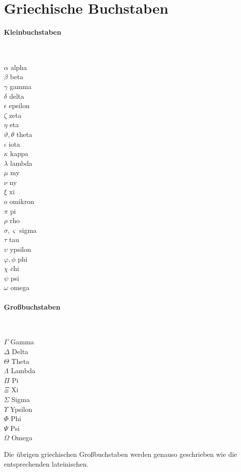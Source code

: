 \documentclass[fontsize=11pt, twoside=false, numbers=autoenddot]{scrbook}
\begin{document}
\section*{Griechische Buchstaben}

\paragraph*{Kleinbuchstaben}
~\par%
$\alpha$ \dotfill alpha \\
$\beta$ \dotfill beta \\
$\gamma$ \dotfill gamma \\
$\delta$ \dotfill delta \\
$\epsilon$ \dotfill epsilon \\
$\zeta$ \dotfill zeta \\
$\eta$ \dotfill eta \\
$\vartheta,\theta$ \dotfill theta \\
$\iota$ \dotfill iota \\
$\kappa$ \dotfill kappa \\
$\lambda$ \dotfill lambda\\
$\mu$ \dotfill my\\
$\nu$ \dotfill ny \\
$\xi$ \dotfill xi\\
$o$ \dotfill omikron\\
$\pi$ \dotfill pi\\
$\rho$ \dotfill rho\\
$\sigma,\varsigma$ \dotfill sigma\\
$\tau$ \dotfill tau\\
$\upsilon$ \dotfill ypsilon\\
$\varphi,\phi$ \dotfill phi\\
$\chi$ \dotfill chi\\
$\psi$ \dotfill psi\\
$\omega$ \dotfill omega


\paragraph*{Großbuchstaben}
~\par%
$\Gamma$ \dotfill Gamma \\
$\Delta$ \dotfill Delta \\
$\Theta$ \dotfill Theta \\
$\Lambda$ \dotfill Lambda \\
$\Pi$ \dotfill Pi \\
$\Xi$ \dotfill Xi \\
$\Sigma$ \dotfill Sigma \\
$\Upsilon$ \dotfill Ypsilon \\
$\Phi$ \dotfill Phi \\
$\Psi$ \dotfill Psi \\
$\Omega$ \dotfill Omega

Die übrigen griechischen Großbuchstaben werden genauso geschrieben wie die entsprechenden lateinischen.

\pagebreak
{}


\end{document}
